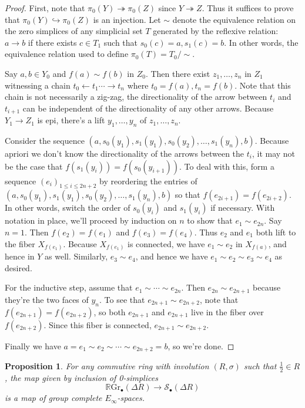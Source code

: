 \documentclass[edeposit,fullpage]{uiucthesis2009}
\newcommand{\mc}{\mathcal}
\newcommand{\RGr}{\mathbb R\mathrm{Gr}}
\theoremstyle{plain}
\numberwithin{lemma}{section}
\newtheorem{proposition}[lemma]{Proposition}
\theoremstyle{definition}
\begin{document}
\begin{proof}
First, note that $\pi_0(Y) \twoheadrightarrow \pi_0(Z)$ since $Y
\twoheadrightarrow Z$. Thus it suffices to prove that $\pi_0(Y)
\hookrightarrow \pi_0(Z)$ is an injection. Let $\sim$ denote the
equivalence relation on the zero simplices of any simplicial set $T$
generated by the reflexive relation: $a \rightarrow b$ if there exists $c \in T_1$
such that $s_0(c) = a, s_1(c) = b$. In other words, the equivalence
relation used to define $\pi_0(T) = T_0/\sim$.

Say $a,b \in Y_0$ and $f(a) \sim f(b)$ in $Z_0$. Then there exist
$z_1,\dots,z_n$ in $Z_1$ witnessing a chain $t_0 \leftarrow t_1 \cdots
\rightarrow t_n$ where $t_0 = f(a), t_n = f(b)$. Note that this chain
is not necessarily a zig-zag, the directionality of the arrow between
$t_i$ and $t_{i+1}$ can be independent of the directionality of any other
arrows. Because $Y_1
\rightarrow Z_1$ is epi, there's a lift $y_1,\dots,y_n$ of
$z_1,\dots,z_n$. 

Consider the sequence
$(a,s_0(y_1),s_1(y_1),s_0(y_2),\dots,s_1(y_n),b)$. Because apriori we
don't know the directionality of the arrows between the $t_i$, it may
not be the case that $f(s_1(y_i)) = f(s_0(y_{i+1}))$. To deal
with this, form a
sequence $(e_i)_{1 \leq i \leq 2n+2} $ by reordering the entries of\\
$(a,s_0(y_1),s_1(y_1),s_0(y_2),\dots,s_1(y_n),b)$ so that $f(e_{2i+1}) =
f(e_{2i+2})$. In other words, switch the order of $s_0(y_i)$ and
$s_1(y_i)$ if necessary. With notation in place, we'll proceed by
induction on $n$ to show that $e_1 \sim e_{2n}$. Say $n =
1$. Then $f(e_2) = f(e_1)$
and  $f(e_3) = f(e_4)$. Thus $e_2$ and
$e_1$ both lift to the fiber $X_{f(e_1)}$. Because $X_{f(e_1)}$ is
connected, we have $e_1 \sim e_2$ in $X_{f(a)}$, and hence in $Y$
as well. Similarly, $e_3 \sim e_4$, and hence we have $e_1 \sim
e_2 \sim e_3\sim e_4$ as desired. 

For the inductive step, assume that $e_1\sim \cdots \sim e_{2n}$. Then
$e_{2n} \sim e_{2n+1}$ because they're the two faces of $y_n$. To see
that $e_{2n+1}\sim e_{2n+2}$, note that $f(e_{2n+1}) = f(e_{2n+2})$,
so both $e_{2n+1}$ and $e_{2n+1}$ live in the fiber over
$f(e_{2n+2})$. Since this fiber is connected, $e_{2n+1} \sim
e_{2n+2}$.

Finally we have $a = e_1 \sim e_2 \sim \cdots \sim e_{2n+2} = b$, so we're done.
\end{proof}

\begin{proposition}
For any commutive ring with involution $(R,\sigma)$ such that
$\frac{1}{2} \in R$, the map given by inclusion of 0-simplices
\[
\RGr_\bullet(\Delta R) \rightarrow \mc S_\bullet(\Delta R)
\]
is a map of group complete $E_\infty$-spaces.
\end{proposition}
\end{document}
